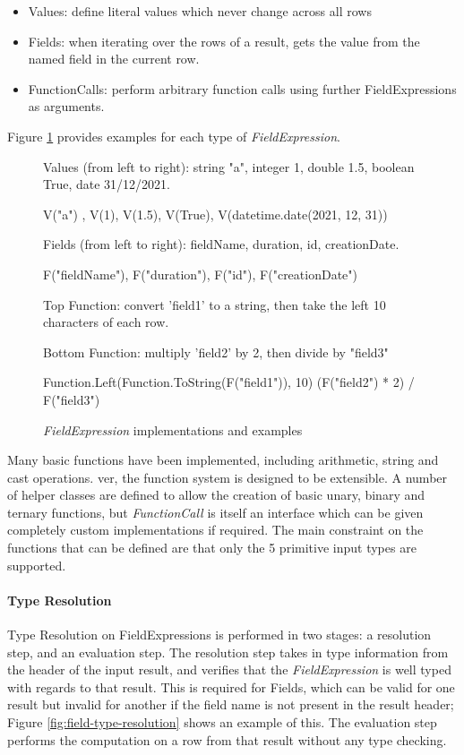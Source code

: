 \begin{itemize}
	\item Values: define literal values which never change across all rows
	\item Fields: when iterating over the rows of a result, gets the value from the named field in the current row.
	\item FunctionCalls: perform arbitrary function calls using further FieldExpressions as arguments.
\end{itemize}

Figure \ref{fig:field-expressions-examples} provides examples for each type of \textit{FieldExpression}.

\begin{figure}[ht]
	Values (from left to right): string "a", integer 1, double 1.5, boolean True, date 31/12/2021.
	\begin{python}
V("a") , V(1), V(1.5), V(True), V(datetime.date(2021, 12, 31))
	\end{python}

	Fields (from left to right): fieldName, duration, id, creationDate.
	\begin{python}
F("fieldName"), F("duration"), F("id"), F("creationDate")
	\end{python}

	Top Function: convert 'field1' to a string, then take the left 10 characters of each row.
	
	Bottom Function: multiply 'field2' by 2, then divide by "field3"
	\begin{python}
Function.Left(Function.ToString(F("field1")), 10)
(F("field2") * 2) / F("field3")
	\end{python}
	\caption{\textit{FieldExpression} implementations and examples}
	\label{fig:field-expressions-examples}
\end{figure}

Many basic functions have been implemented, including arithmetic, string and cast operations. ver, the function system is designed to be extensible. A number of helper classes are defined to allow the creation of basic unary, binary and ternary functions, but \textit{FunctionCall} is itself an interface which can be given completely custom implementations if required. The main constraint on the functions that can be defined are that only the 5 primitive input types are supported.

\paragraph{Type Resolution} 
Type Resolution on FieldExpressions is performed in two stages: a resolution step, and an evaluation step. The resolution step takes in type information from the header of the input result, and verifies that the \textit{FieldExpression} is well typed with regards to that result. This is required for Fields, which can be valid for one result but invalid for another if the field name is not present in the result header; Figure \ref{fig:field-type-resolution} shows an example of this. The evaluation step performs the computation on a row from that result without any type checking. 

